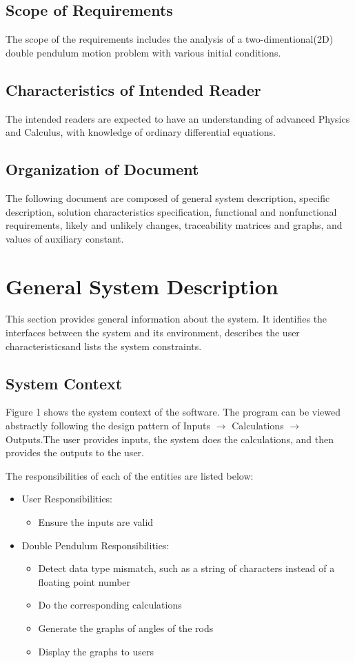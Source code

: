 \documentclass[12pt]{article}
\begin{document}
\subsection{Scope of Requirements}\label{sec_scope}
The scope of the requirements includes the analysis of a two-dimentional(2D) double pendulum motion problem with various initial conditions. 

\subsection{Characteristics of Intended Reader}\label{sec_intendedreader}
The intended readers are expected to have an understanding of advanced Physics and Calculus, with knowledge of ordinary differential equations. 

\subsection{Organization of Document}\label{sec_organization}
The following document are composed of general system description, specific description, solution characteristics specification, functional and nonfunctional requirements, likely and unlikely changes, traceability matrices and graphs, and values of auxiliary constant.


\section{General System Description}\label{sec_generalsystem}
This section provides general information about the system. It identifies the interfaces between the system and its environment, describes the user characteristicsand lists the system constraints. 

\subsection{System Context}\label{sec_syscontext}
Figure 1 shows the system context of the software. The program can be viewed abstractly following the design pattern of Inputs $\rightarrow$ Calculations $\rightarrow$ Outputs.The user provides inputs, the system does the calculations, and then provides the outputs to the user.


The responsibilities of each of the entities are listed below:
\begin{itemize}
\item User Responsibilities:
\begin{itemize}
\item Ensure the inputs are valid
\end{itemize}
\item Double Pendulum Responsibilities:
\begin{itemize}
\item Detect data type mismatch, such as a string of characters instead of a
  floating point number
\item Do the corresponding calculations  
\item Generate the graphs of angles of the rods
\item Display the graphs to users
\end{itemize}
\end{itemize}
\end{document}
